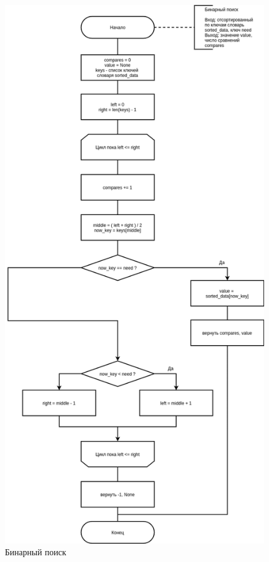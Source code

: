 \begin{figure}[H]
	\begin{center}
		\includegraphics[scale=0.4]{img/binary.png}
	\end{center}
	\captionsetup{justification=centering}
	\caption{Бинарный поиск}
	\label{img:binary}
\end{figure}

